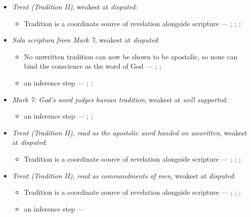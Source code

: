 \documentclass[11pt]{article}
\begin{document}
\begin{itemize}
\item \emph{Trent (Tradition II)}, weakest at \emph{disputed}:
\begin{itemize}
\item Tradition is a coordinate source of revelation alongside scripture --- \cite[Trent, Session IV (1546), Decree on Sacred Books and Traditions]{tanner-decrees-1990}; \cite{mathison-shape-sola-scriptura-2001}; \cite{geiselmann-meaning-of-tradition-1966}; \cite{congar-tradition-and-traditions-1966}
\end{itemize}
\item \emph{Sola scriptura from Mark 7}, weakest at \emph{disputed}:
\begin{itemize}
\item No unwritten tradition can now be shown to be apostolic, so none can bind the conscience as the word of God --- \cite[503--511]{whitaker-disputation-1849}; \cite[594]{whitaker-disputation-1849}; \cite[I.6]{westminster-confession-1647}
\item an inference step --- \cite{geiselmann-meaning-of-tradition-1966}; \cite[Vatican I (1870), Pastor Aeternus, ch. 4]{tanner-decrees-1990}; \cite{florovsky-bible-church-tradition-1972}
\end{itemize}
\item \emph{Mark 7: God’s word judges human tradition}, weakest at \emph{well supported}:
\begin{itemize}
\item an inference step --- \cite[Vatican II (1965), Dei Verbum 10]{tanner-decrees-1990}; \cite[IV.x.23]{calvin-institutes-1960}; \cite[15--16]{wenham-our-lords-view-1953}
\end{itemize}
\item \emph{Trent (Tradition II), read as the apostolic word handed on unwritten}, weakest at \emph{disputed}:
\begin{itemize}
\item Tradition is a coordinate source of revelation alongside scripture --- \cite[Trent, Session IV (1546), Decree on Sacred Books and Traditions]{tanner-decrees-1990}; \cite{mathison-shape-sola-scriptura-2001}; \cite{geiselmann-meaning-of-tradition-1966}; \cite{congar-tradition-and-traditions-1966}
\end{itemize}
\item \emph{Trent (Tradition II), read as commandments of men}, weakest at \emph{disputed}:
\begin{itemize}
\item Tradition is a coordinate source of revelation alongside scripture --- \cite[Trent, Session IV (1546), Decree on Sacred Books and Traditions]{tanner-decrees-1990}; \cite{mathison-shape-sola-scriptura-2001}; \cite{geiselmann-meaning-of-tradition-1966}; \cite{congar-tradition-and-traditions-1966}
\item an inference step --- \cite[IV.x.23]{calvin-institutes-1960}
\end{itemize}
\end{itemize}
\end{document}
